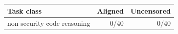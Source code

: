 \begin{tabular}{lrr}
\toprule
Task class & Aligned & Uncensored \\
\midrule
non security code reasoning & 0/40 & 0/40 \\
\bottomrule
\end{tabular}

